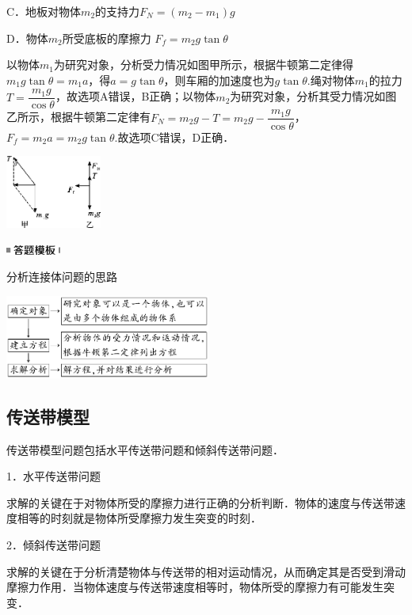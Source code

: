 \documentclass[cn,10.5pt,chinese,mac,chinesefont=founder]{elegantbook}
\begin{document}
C．地板对物体$m_2$的支持力$F_N=(m_2-m_1)g$

D．物体$m_2$所受底板的摩擦力 $F_f=m_2g\tan\theta$
\begin{solution}
	以物体$m_1$为研究对象，分析受力情况如图甲所示，根据牛顿第二定律得$m_1g\tan\theta=m_1a$，得$a=g\tan \theta$，则车厢的加速度也为$g\tan\theta$.绳对物体$m_1$的拉力$T=\dfrac{m_1g}{\cos\theta}$，故选项A错误，B正确；以物体$m_2$为研究对象，分析其受力情况如图乙所示，根据牛顿第二定律有$F_N=m_2g-T=m_2g-\dfrac{m_1g}{\cos\theta}$，$F_f=m_2a=m_2g\tan\theta$.故选项C错误，D正确．
\end{solution}


\begin{center}\includegraphics[width=1.23958in,height=0.94792in]{media/image120.png}\end{center}
\begin{center}\includegraphics[width=0.70833in,height=0.125in]{media/image25.png}\end{center}
分析连接体问题的思路

\begin{center}\includegraphics[width=2.65625in,height=1.08333in]{media/image121.png}\end{center}
\subsection{传送带模型}

传送带模型问题包括水平传送带问题和倾斜传送带问题．

1．水平传送带问题

求解的关键在于对物体所受的摩擦力进行正确的分析判断．物体的速度与传送带速度相等的时刻就是物体所受摩擦力发生突变的时刻．

2．倾斜传送带问题

求解的关键在于分析清楚物体与传送带的相对运动情况，从而确定其是否受到滑动摩擦力作用．当物体速度与传送带速度相等时，物体所受的摩擦力有可能发生突变．
\end{document}
